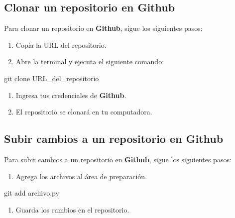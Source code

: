 \documentclass[
  a4paper,
  DIV=11,
  numbers=noendperiod,
  onepage,
  openany]{scrreprt}
\newenvironment{Shaded}{\begin{snugshade}}{\end{snugshade}}
\newcommand{\FunctionTok}[1]{\textcolor[rgb]{0.28,0.35,0.67}{#1}}
\newcommand{\NormalTok}[1]{\textcolor[rgb]{0.00,0.23,0.31}{#1}}
\providecommand{\tightlist}{%
  \setlength{\itemsep}{0pt}\setlength{\parskip}{0pt}}\usepackage{longtable,booktabs,array}
\begin{document}
\subsection{Clonar un repositorio en
Github}\label{clonar-un-repositorio-en-github}

Para clonar un repositorio en \textbf{Github}, sigue los siguientes
pasos:

\begin{enumerate}
\def\labelenumi{\arabic{enumi}.}
\item
  Copia la URL del repositorio.
\item
  Abre la terminal y ejecuta el siguiente comando:
\end{enumerate}

\begin{Shaded}
\begin{Highlighting}[]
\FunctionTok{git}\NormalTok{ clone URL\_del\_repositorio}
\end{Highlighting}
\end{Shaded}

\begin{enumerate}
\def\labelenumi{\arabic{enumi}.}
\setcounter{enumi}{2}
\item
  Ingresa tus credenciales de \textbf{Github}.
\item
  El repositorio se clonará en tu computadora.
\end{enumerate}

\subsection{Subir cambios a un repositorio en
Github}\label{subir-cambios-a-un-repositorio-en-github}

Para subir cambios a un repositorio en \textbf{Github}, sigue los
siguientes pasos:

\begin{enumerate}
\def\labelenumi{\arabic{enumi}.}
\tightlist
\item
  Agrega los archivos al área de preparación.
\end{enumerate}

\begin{Shaded}
\begin{Highlighting}[]
\FunctionTok{git}\NormalTok{ add archivo.py}
\end{Highlighting}
\end{Shaded}

\begin{enumerate}
\def\labelenumi{\arabic{enumi}.}
\setcounter{enumi}{1}
\tightlist
\item
  Guarda los cambios en el repositorio.
\end{enumerate}
\end{document}
